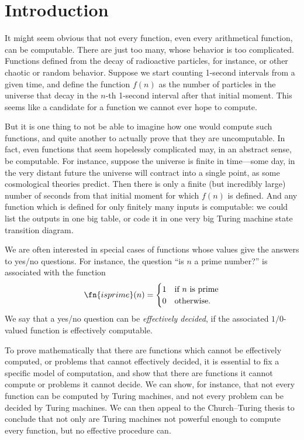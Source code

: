 \documentclass[10pt,a4paper]{article}
\theoremstyle{plain}
\theoremstyle{definition}
\theoremstyle{remark}
\newcommand*{\olfileid}[3]{}
\newcommand*{\olsection}[1]{\section*{#1}}
\begin{document}



\olfileid{tur}{und}{int} 
\olsection{Introduction}

It might seem obvious that not every function, even every arithmetical
function, can be computable. There are just too many, whose behavior
is too complicated.  Functions defined from the decay of radioactive
particles, for instance, or other chaotic or random behavior. Suppose
we start counting 1-second intervals from a given time, and define the
function $f(n)$ as the number of particles in the universe that decay
in the $n$-th 1-second interval after that initial moment.  This seems
like a candidate for a function we cannot ever hope to compute.

But it is one thing to not be able to imagine how one would compute
such functions, and quite another to actually prove that they are
uncomputable.  In fact, even functions that seem hopelessly
complicated may, in an abstract sense, be computable.  For instance,
suppose the universe is finite in time---some day, in the very distant
future the universe will contract into a single point, as some
cosmological theories predict. Then there is only a finite (but
incredibly large) number of seconds from that initial moment for which
$f(n)$ is defined.  And any function which is defined for only finitely
many inputs is computable: we could list the outputs in one big table,
or code it in one very big Turing machine state transition diagram.

We are often interested in special cases of functions whose values give
the answers to yes/no questions.  For instance, the question ``is $n$
a prime number?'' is associated with the function
\[
\fn{isprime}(n) = \begin{cases}
  1 & \text{if $n$ is prime}\\
  0 & \text{otherwise.}
  \end{cases}
\]
We say that a yes/no question can be \emph{effectively decided}, if
the associated $1/0$-valued function is effectively computable.

To prove mathematically that there are functions which cannot be
effectively computed, or problems that cannot effectively decided, it
is essential to fix a specific model of computation, and show
that there are functions it cannot compute or problems it cannot
decide.  We can show, for instance, that not every function can be
computed by Turing machines, and not every problem can be decided by
Turing machines.  We can then appeal to the Church--Turing thesis to
conclude that not only are Turing machines not powerful enough to
compute every function, but no effective procedure can.
\end{document}

